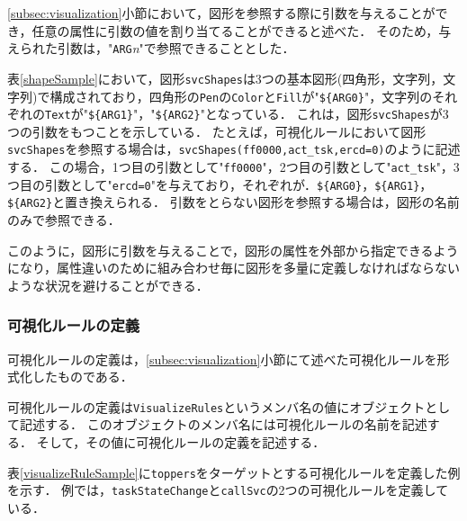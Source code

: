\ref{subsec:visualization}小節において，図形を参照する際に引数を与えることができ，任意の属性に引数の値を割り当てることができると述べた．
そのため，与えられた引数は，"{\tt ARG}{\it n}"で参照できることとした．

表\ref{shapeSample}において，図形{\tt svcShapes}は3つの基本図形(四角形，文字列，文字列)で構成されており，四角形の{\tt Pen}の{\tt Color}と{\tt Fill}が"\verb|${ARG0}|"，文字列のそれぞれの{\tt Text}が"\verb|${ARG1}|"，"\verb|${ARG2}|"となっている．
これは，図形{\tt svcShapes}が3つの引数をもつことを示している．
たとえば，可視化ルールにおいて図形{\tt svcShapes}を参照する場合は，\verb|svcShapes(ff0000,act_tsk,ercd=0)|のように記述する．
この場合，1つ目の引数として"{\tt ff0000}"，2つ目の引数として"{\tt act\_tsk}"，3つ目の引数として"{\tt ercd=0}"を与えており，それぞれが．\verb|${ARG0}|，\verb|${ARG1}|，\verb|${ARG2}|と置き換えられる．
引数をとらない図形を参照する場合は，図形の名前のみで参照できる．

このように，図形に引数を与えることで，図形の属性を外部から指定できるようになり，属性違いのために組み合わせ毎に図形を多量に定義しなければならないような状況を避けることができる．

\subsubsection{可視化ルールの定義}

可視化ルールの定義は，\ref{subsec:visualization}小節にて述べた可視化ルールを形式化したものである．

可視化ルールの定義は{\tt VisualizeRules}というメンバ名の値にオブジェクトとして記述する．
このオブジェクトのメンバ名には可視化ルールの名前を記述する．
そして，その値に可視化ルールの定義を記述する．

表\ref{visualizeRuleSample}に{\tt toppers}をターゲットとする可視化ルールを定義した例を示す．
例では，{\tt taskStateChange}と{\tt callSvc}の2つの可視化ルールを定義している．

